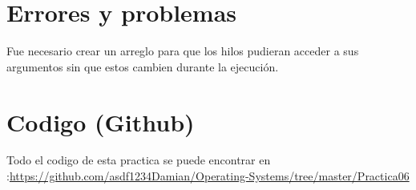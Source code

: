 \documentclass[12pt]{article}
\begin{document}
\section{Errores y problemas}
Fue necesario crear un arreglo para que los hilos pudieran acceder a sus argumentos sin que estos cambien durante la ejecución.  

\section{Codigo (Github)}
Todo el codigo de esta practica se puede encontrar en :\url{https://github.com/asdf1234Damian/Operating-Systems/tree/master/Practica06}
\nocite{*}
 

\end{document}
